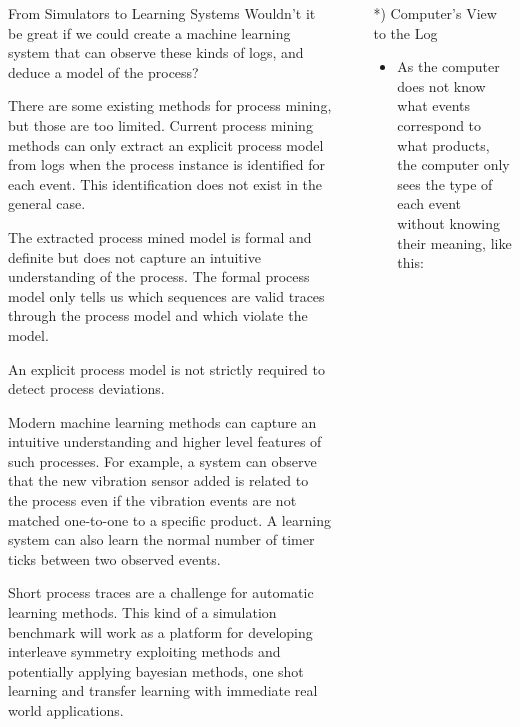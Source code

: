 \documentclass[final,xcolor={usenames,x11names}]{beamer}
\newlength{\sepwid}
\newlength{\halfcolwid}
\newlength{\onecolwid}
\begin{document}
\begin{frame}[t]
\begin{columns}[t]
\begin{column}{\onecolwid}
\begin{block}{From Simulators to Learning Systems}
Wouldn't it be great if we could create a machine learning system that can observe these kinds of logs, and deduce a model of the process?

There are some existing methods for process mining, but those are too limited. Current process mining methods can only extract an explicit process model
from logs when the process instance is identified for each event. This identification does not exist in the general case.

The extracted process mined model is formal and definite but does not capture
an intuitive understanding of the process. The formal process model only tells us which sequences are valid traces through the process model and which violate the model.

An explicit process model is not strictly required to detect process deviations.

Modern machine learning methods can capture an intuitive understanding and higher level features of such processes. For example, a system can observe that the new vibration sensor added is related to the process
even if the vibration events are not matched one-to-one to a specific product. A learning system can also learn the normal number of timer ticks between two observed events.

Short process traces are a challenge for automatic learning methods. This kind of a simulation benchmark will work as a platform for developing interleave symmetry
exploiting methods and potentially applying bayesian methods, one shot learning and transfer learning with immediate real world applications.
\end{block}

\end{column}
\begin{column}{\sepwid}\end{column} %

\begin{column}{\halfcolwid}

\vspace{12cm}

\begin{alertblock}{*) Computer's View to the Log}

\begin{itemize}
\item As the computer does not know what events correspond to what products, the computer only sees the type of each event without knowing their meaning, like this:
\end{itemize}


\end{alertblock}
\end{column}
\end{columns}
\end{frame}
\end{document}
